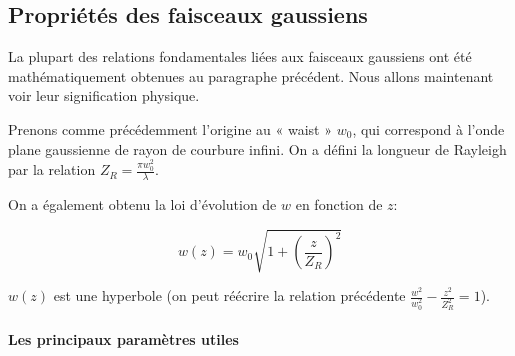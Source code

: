 \documentclass{book}
\begin{document}
\subsection{Propriétés des faisceaux gaussiens}

 La plupart des relations fondamentales liées aux faisceaux gaussiens ont été mathématiquement obtenues au paragraphe précédent. Nous allons maintenant voir leur signification physique.

Prenons comme précédemment l'origine au « waist » $w_0$, qui correspond à l'onde plane gaussienne de rayon de courbure infini. On a défini la longueur de Rayleigh par la relation $Z_R = \frac {\pi w_0^2}\lambda$.

On a également obtenu la loi d'évolution de $w$ en fonction de $z$:

$$w(z) = w_0 \sqrt{1+\left(\frac z {Z_R}\right)^2}$$

$w(z)$ est une hyperbole (on peut réécrire la relation précédente $\frac {w^2}{w_0^2}-\frac{z^2}{Z_R^2} = 1$).

\paragraph{Les principaux paramètres utiles}
\end{document}

